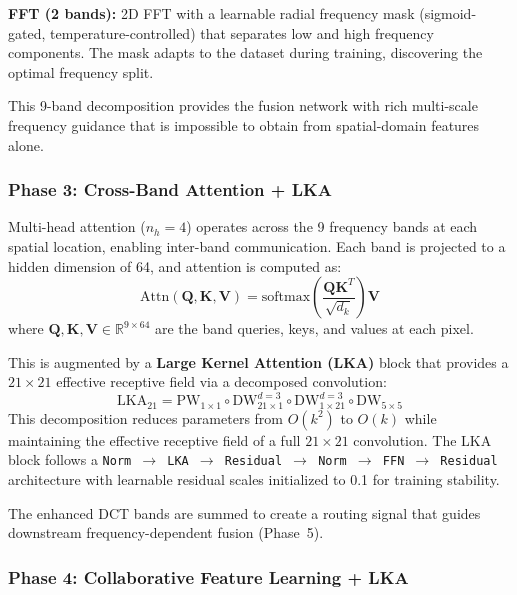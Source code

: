 \documentclass[10pt,twocolumn,letterpaper]{article}
\begin{document}
\noindent\textbf{FFT (2 bands):} 2D FFT with a learnable radial frequency mask (sigmoid-gated, temperature-controlled) that separates low and high frequency components. The mask adapts to the dataset during training, discovering the optimal frequency split.

This 9-band decomposition provides the fusion network with rich multi-scale frequency guidance that is impossible to obtain from spatial-domain features alone.

\subsubsection{Phase 3: Cross-Band Attention + LKA}

Multi-head attention ($n_h=4$) operates across the 9 frequency bands at each spatial location, enabling inter-band communication. Each band is projected to a hidden dimension of 64, and attention is computed as:
\begin{equation}
\text{Attn}(\mathbf{Q}, \mathbf{K}, \mathbf{V}) = \text{softmax}\!\left(\frac{\mathbf{Q}\mathbf{K}^T}{\sqrt{d_k}}\right)\mathbf{V}
\end{equation}
where $\mathbf{Q}, \mathbf{K}, \mathbf{V} \in \mathbb{R}^{9 \times 64}$ are the band queries, keys, and values at each pixel.

This is augmented by a \textbf{Large Kernel Attention (LKA)} block \cite{van} that provides a $21\times 21$ effective receptive field via a decomposed convolution:
\begin{equation}
\text{LKA}_{21} = \text{PW}_{1\times 1} \circ \text{DW}_{21\times 1}^{d=3} \circ \text{DW}_{1\times 21}^{d=3} \circ \text{DW}_{5\times 5}
\end{equation}
This decomposition reduces parameters from $O(k^2)$ to $O(k)$ while maintaining the effective receptive field of a full $21 \times 21$ convolution. The LKA block follows a \texttt{Norm $\to$ LKA $\to$ Residual $\to$ Norm $\to$ FFN $\to$ Residual} architecture with learnable residual scales initialized to 0.1 for training stability.

The enhanced DCT bands are summed to create a routing signal that guides downstream frequency-dependent fusion (Phase~5).

\subsubsection{Phase 4: Collaborative Feature Learning + LKA}
\end{document}

